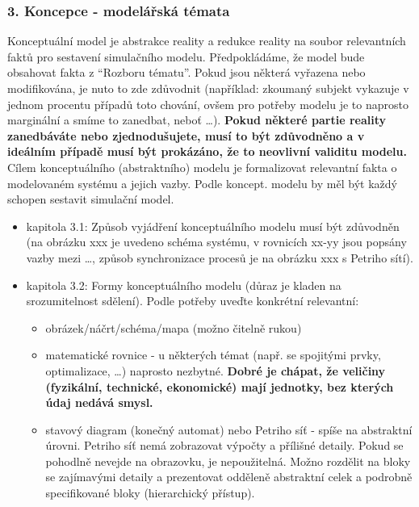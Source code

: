 \documentclass{article}
\begin{document}
\subsubsection{3. Koncepce - modelářská
témata}\label{koncepce---modeluxe1ux159skuxe1-tuxe9mata}

Konceptuální model je abstrakce reality a redukce reality na soubor
relevantních faktů pro sestavení simulačního modelu. Předpokládáme, že
model bude obsahovat fakta z ``Rozboru tématu''. Pokud jsou některá
vyřazena nebo modifikována, je nuto to zde zdůvodnit (například:
zkoumaný subjekt vykazuje v jednom procentu případů toto chování, ovšem
pro potřeby modelu je to naprosto marginální a smíme to zanedbat, neboť
\ldots{}). \textbf{Pokud některé partie reality zanedbáváte nebo
zjednodušujete, musí to být zdůvodněno a v ideálním případě musí být
prokázáno, že to neovlivní validitu modelu.} Cílem konceptuálního
(abstraktního) modelu je formalizovat relevantní fakta o modelovaném
systému a jejich vazby. Podle koncept. modelu by měl být každý schopen
sestavit simulační model.\\

\begin{itemize}
\tightlist
\item
  kapitola 3.1: Způsob vyjádření konceptuálního modelu musí být
  zdůvodněn (na obrázku xxx je uvedeno schéma systému, v rovnicích xx-yy
  jsou popsány vazby mezi \ldots{}, způsob synchronizace procesů je na
  obrázku xxx s Petriho sítí).
\item
  kapitola 3.2: Formy konceptuálního modelu (důraz je kladen na
  srozumitelnost sdělení). Podle potřeby uveďte konkrétní relevantní:

  \begin{itemize}
  \tightlist
  \item
    obrázek/náčrt/schéma/mapa (možno čitelně rukou)
  \item
    matematické rovnice - u některých témat (např. se spojitými prvky,
    optimalizace, \ldots{}) naprosto nezbytné. \textbf{Dobré je chápat,
    že veličiny (fyzikální, technické, ekonomické) mají jednotky, bez
    kterých údaj nedává smysl.}
  \item
    stavový diagram (konečný automat) nebo Petriho síť - spíše na
    abstraktní úrovni. Petriho síť nemá zobrazovat výpočty a přílišné
    detaily. Pokud se pohodlně nevejde na obrazovku, je nepoužitelná.
    Možno rozdělit na bloky se zajímavými detaily a prezentovat odděleně
    abstraktní celek a podrobně specifikované bloky (hierarchický
    přístup).
  \end{itemize}
\end{itemize}
\end{document}
